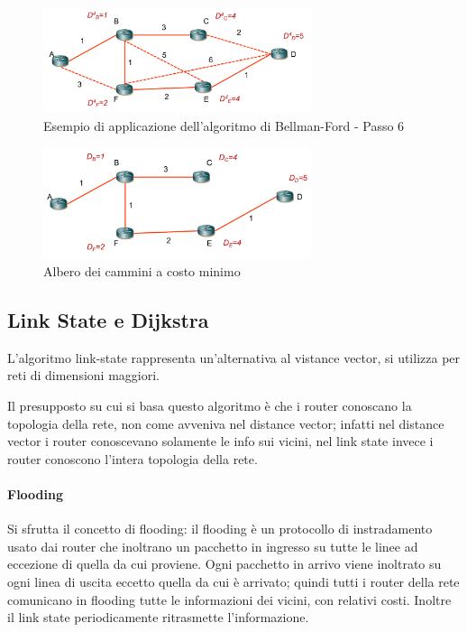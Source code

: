 \begin{figure}[h!]
    \centering
    \includegraphics[width=0.7\textwidth]{images/bf5.png}
    \caption{Esempio di applicazione dell'algoritmo di Bellman-Ford - Passo 6}
    \label{fig:bf6}
\end{figure}

\begin{figure}[h!]
    \centering
    \includegraphics[width=0.7\textwidth]{images/bf7.png}
    \caption{Albero dei cammini a costo minimo}
    \label{fig:bf7}
\end{figure}

\subsection{Link State e Dijkstra}

L'algoritmo link-state rappresenta un'alternativa al vistance vector, si utilizza per reti di dimensioni maggiori.

Il presupposto su cui si basa questo algoritmo è che i router conoscano la topologia della rete, non come avveniva nel distance vector; infatti nel distance vector i router conoscevano solamente le info sui vicini, nel link state invece i router conoscono l'intera topologia della rete.

\paragraph{Flooding}
Si sfrutta il concetto di flooding: il flooding è un protocollo di instradamento usato dai router che inoltrano un pacchetto in ingresso su tutte le linee ad eccezione di quella da cui proviene. Ogni pacchetto in arrivo viene inoltrato su ogni linea di uscita eccetto quella da cui è arrivato;
quindi tutti i router della rete comunicano in flooding tutte le informazioni dei vicini, con relativi costi. Inoltre il link state periodicamente ritrasmette l'informazione.

